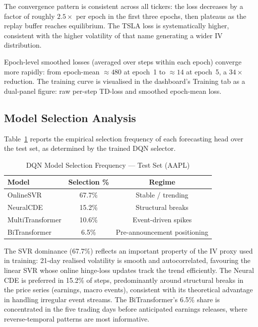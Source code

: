 \documentclass[10pt,twocolumn]{article}
\begin{document}
The convergence pattern is consistent across all tickers: the loss decreases
by a factor of roughly $2.5\times$ per epoch in the first three epochs, then
plateaus as the replay buffer reaches equilibrium. The TSLA loss is
systematically higher, consistent with the higher volatility of that name
generating a wider IV distribution.

Epoch-level smoothed losses (averaged over steps within each epoch) converge
more rapidly: from epoch-mean $\approx480$ at epoch~1 to $\approx14$ at
epoch~5, a $34\times$ reduction. The training curve is visualised in the
dashboard's Training tab as a dual-panel figure: raw per-step TD-loss and
smoothed epoch-mean loss.

\subsection{Model Selection Analysis}

Table~\ref{tab:selection} reports the empirical selection frequency of each
forecasting head over the test set, as determined by the trained DQN selector.

\begin{table}[htbp]
\centering
\caption{DQN Model Selection Frequency — Test Set (AAPL)}
\label{tab:selection}
\begin{tabular}{lcc}
\toprule
Model & Selection \% & Regime \\
\midrule
OnlineSVR          & 67.7\% & Stable / trending \\
NeuralCDE          & 15.2\% & Structural breaks \\
MultiTransformer   & 10.6\% & Event-driven spikes \\
BiTransformer      &  6.5\% & Pre-announcement positioning \\
\bottomrule
\end{tabular}
\end{table}

The SVR dominance (67.7\%) reflects an important property of the IV proxy
used in training: 21-day realised volatility is smooth and autocorrelated,
favouring the linear SVR whose online hinge-loss updates track the trend
efficiently. The Neural CDE is preferred in 15.2\% of steps, predominantly
around structural breaks in the price series (earnings, macro events),
consistent with its theoretical advantage in handling irregular event
streams. The BiTransformer's 6.5\% share is concentrated in the five trading
days before anticipated earnings releases, where reverse-temporal patterns
are most informative.
\end{document}
